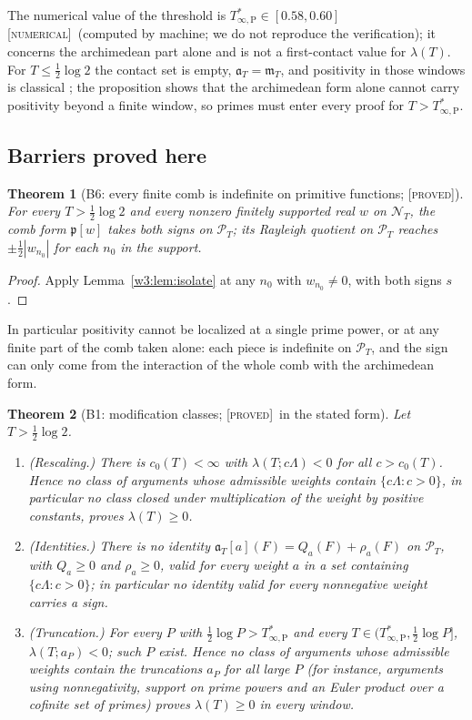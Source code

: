 \documentclass[11pt]{amsart}
\newtheorem{theorem}{Theorem}[section]
\theoremstyle{definition}
\theoremstyle{remark}
\numberwithin{equation}{section}
\newcommand{\PT}{\mathcal{P}_T}                        %
\newcommand{\NT}{\mathcal{N}_T}                        %
\newcommand{\mT}{\mathfrak{m}_T}                       %
\newcommand{\aT}{\mathfrak{a}_T}                       %
\newcommand{\lam}{\lambda(T)}                          %
\newcommand{\Tarch}{T^{*}_{\infty,\mathrm P}}          %
\newcommand{\stag}[1]{\textsc{[#1]}}
\newcommand{\PROVED}{\stag{proved}}
\newcommand{\NUM}{\stag{numerical}}
\begin{document}
The numerical value of the threshold is $\Tarch\in[0.58,0.60]$ \NUM\ (computed by machine; we do not
reproduce the verification); it concerns the archimedean part alone and is not a first-contact value for
$\lam$. For $T\le\frac12\log2$ the contact set is empty, $\aT=\mT$, and positivity in
those windows is classical \cite{Yoshida1992}; the proposition shows that the archimedean form alone cannot
carry positivity beyond a finite window, so primes must enter every proof for $T>\Tarch$.

\subsection{Barriers proved here}\label{w3:subsec:proved}

\begin{theorem}[B6: every finite comb is indefinite on primitive functions; \PROVED]\label{w3:bar:B6}
For every $T>\frac12\log2$ and every nonzero finitely supported real $w$ on $\NT$, the comb form
$\mathfrak p[w]$ takes both signs on $\PT$; its Rayleigh quotient on $\PT$ reaches $\pm\frac12|w_{n_0}|$ for each
$n_0$ in the support.
\end{theorem}

\begin{proof}
Apply Lemma~\ref{w3:lem:isolate} at any $n_0$ with $w_{n_0}\ne0$, with both signs $s$.
\end{proof}

In particular positivity cannot be localized at a single prime power, or at any finite part of the comb taken
alone: each piece is indefinite on $\PT$, and the sign can only come from the interaction of the whole comb with
the archimedean form.

\begin{theorem}[B1: modification classes; \PROVED\ in the stated form]\label{w3:bar:B1}
Let $T>\frac12\log2$.
\begin{enumerate}[label=(\roman*)]
\item\label{w3:B1i} (Rescaling.) There is $c_0(T)<\infty$ with $\lambda(T;c\Lambda)<0$ for all $c>c_0(T)$.
Hence no class of arguments whose admissible weights contain $\{c\Lambda:c>0\}$, in particular no class closed
under multiplication of the weight by positive constants, proves $\lam\ge0$.
\item\label{w3:B1ii} (Identities.) There is no identity
$\aT[a](F)=Q_a(F)+\rho_a(F)$ on $\PT$, with $Q_a\ge0$ and $\rho_a\ge0$, valid for every weight $a$ in a set
containing $\{c\Lambda:c>0\}$; in particular no identity valid for every nonnegative weight carries a sign.
\item\label{w3:B1iii} (Truncation.) For every $P$ with $\frac12\log P>\Tarch$ and every
$T\in(\Tarch,\frac12\log P]$, $\lambda(T;a_P)<0$; such $P$ exist. Hence no class of arguments whose admissible
weights contain the truncations $a_P$ for all large $P$ (for instance, arguments using nonnegativity, support
on prime powers and an Euler product over a cofinite set of primes) proves $\lam\ge0$ in every window.
\end{enumerate}
\end{theorem}
\end{document}
